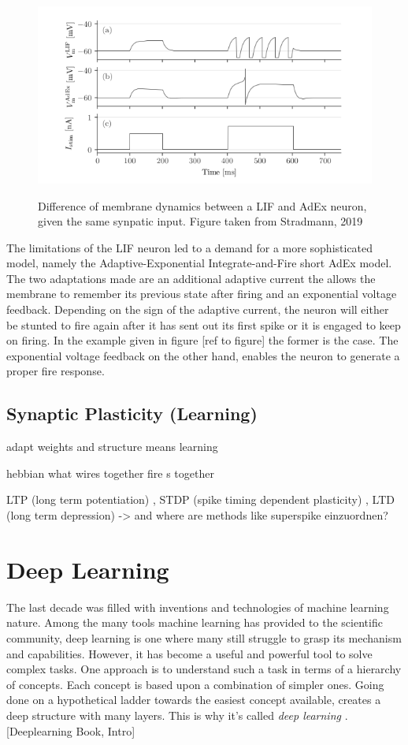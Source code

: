 \begin{figure}
	\includegraphics[width=\linewidth]{figures/LIFvsAdEx.png}
	\label{lifvsadex}
	\caption{Difference of membrane dynamics between a LIF and AdEx neuron, given the same synpatic input. Figure taken from Stradmann, 2019}
\end{figure}

The limitations of the LIF neuron led to a demand for a more sophisticated model, namely the Adaptive-Exponential Integrate-and-Fire short AdEx model. The two adaptations made are an additional adaptive current the allows the membrane to remember its previous state after firing and an exponential voltage feedback. Depending on the sign of the adaptive current, the neuron will either be stunted to fire again after it has sent out its first spike or it is engaged to keep on firing. In the example given in figure [ref to figure] the former is the case. The exponential voltage feedback on the other hand, enables the neuron to generate a proper fire response.\\

\subsection{Synaptic Plasticity (Learning)}
adapt weights and structure means learning

hebbian what wires together fire s together

LTP (long term potentiation) , STDP (spike timing dependent plasticity) , LTD (long term depression) -> and where are methods like superspike einzuordnen?




\section{Deep Learning}
\label{deeplearning}
The last decade was filled with inventions and technologies of machine learning nature. Among the many tools machine learning has provided to the scientific community, deep learning is one where many still struggle to grasp its mechanism and capabilities. However, it has become a useful and powerful tool to solve complex tasks. One approach is to understand such a task in terms of a hierarchy of concepts. Each concept is based upon a combination of simpler ones. Going done on a hypothetical ladder towards the easiest concept available, creates a deep structure with many layers. This is why it's called \textit{deep learning} . [Deeplearning Book, Intro]

